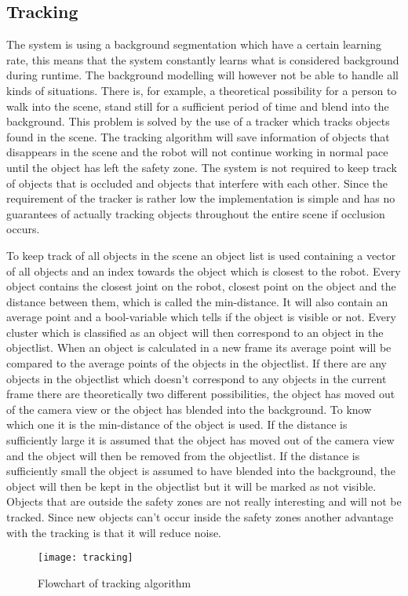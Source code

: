 
\subsection{Tracking}
The system is using a background segmentation which have a certain learning rate, this means that the system constantly learns what is considered background during runtime. The background modelling will however not be able to handle all kinds of situations. There is, for example, a theoretical possibility for a person to walk into the scene, stand still for a sufficient period of time and blend into the background. This problem is solved by the use of a tracker which tracks objects found in the scene. The tracking algorithm will save information of objects that disappears in the scene and the robot will not continue working in normal pace until the object has left the safety zone. The system is not required to keep track of objects that is occluded and objects that interfere with each other. Since the requirement of the tracker is rather low the implementation is simple and has no guarantees of actually tracking objects throughout the entire scene if occlusion occurs.

To keep track of all objects in the scene an object list is used containing a vector of all objects and an index towards the object which is closest to the robot. Every object contains the closest joint on the robot, closest point on the object and the distance between them, which is called the min-distance. It will also contain an average point and a bool-variable which tells if the object is visible or not.  Every cluster which is classified as an object will then correspond to an object in the objectlist. When an object is calculated in a new frame its average point will be compared to the average points of the objects in the objectlist. If there are any objects in the objectlist which doesn’t correspond to any objects in the current frame there are theoretically two different possibilities, the object has moved out of the camera view or the object has blended into the background. To know which one it is the min-distance of the object is used. If the distance is sufficiently large it is assumed that the object has moved out of the camera view and the object will then be removed from the objectlist. If the distance is sufficiently small the object is assumed to have blended into the background, the object will then be kept in the objectlist but it will be marked as not visible. Objects that are outside the safety zones are not really interesting and will not be tracked. Since new objects can’t occur inside the safety zones another advantage with the tracking is that it will reduce noise.

\begin{figure}[H]
\begin{center}
\texttt{[image: tracking]}
\caption{Flowchart of tracking algorithm}
\label{tracking}
\end{center}
\end{figure}
